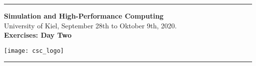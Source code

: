 
\hrule
\hfill%
\begin{minipage}{12cm}
    \textbf{\Large
      Simulation and High-Performance Computing\\
    }
    \vspace*{0.3cm}
    {\large
      University of Kiel, September 28th to Oktober 9th, 2020.\\
    }
    \vspace*{0.1cm}
\textbf{\Large
	Exercises: Day Two
}
\end{minipage}%
\hfill%
\begin{minipage}{3cm}
  \texttt{[image: csc\_logo]}
\end{minipage}
\hrule

